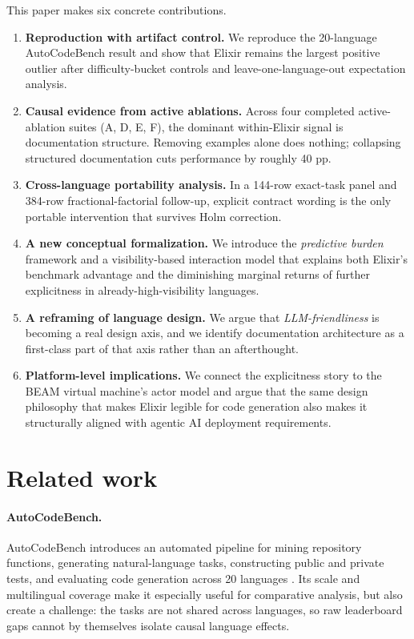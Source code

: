 \documentclass[11pt]{article}
\newcommand{\acb}{AutoCodeBench}
\newcommand{\pp}{pp}
\newcommand{\elixir}{Elixir}
\begin{document}
This paper makes six concrete contributions.

\begin{enumerate}
  \item \textbf{Reproduction with artifact control.} We reproduce the 20-language \acb{} result and show that \elixir{} remains the largest positive outlier after difficulty-bucket controls and leave-one-language-out expectation analysis.
  \item \textbf{Causal evidence from active ablations.} Across four completed active-ablation suites (A, D, E, F), the dominant within-\elixir{} signal is documentation structure. Removing examples alone does nothing; collapsing structured documentation cuts performance by roughly 40 \pp.
  \item \textbf{Cross-language portability analysis.} In a 144-row exact-task panel and 384-row fractional-factorial follow-up, explicit contract wording is the only portable intervention that survives Holm correction.
  \item \textbf{A new conceptual formalization.} We introduce the \emph{predictive burden} framework and a visibility-based interaction model that explains both \elixir{}'s benchmark advantage and the diminishing marginal returns of further explicitness in already-high-visibility languages.
  \item \textbf{A reframing of language design.} We argue that \emph{LLM-friendliness} is becoming a real design axis, and we identify documentation architecture as a first-class part of that axis rather than an afterthought.
  \item \textbf{Platform-level implications.} We connect the explicitness story to the BEAM virtual machine's actor model and argue that the same design philosophy that makes \elixir{} legible for code generation also makes it structurally aligned with agentic AI deployment requirements.
\end{enumerate}

\section{Related work}

\paragraph{AutoCodeBench.}
\acb{} introduces an automated pipeline for mining repository functions, generating natural-language tasks, constructing public and private tests, and evaluating code generation across 20 languages \cite{acb}. Its scale and multilingual coverage make it especially useful for comparative analysis, but also create a challenge: the tasks are not shared across languages, so raw leaderboard gaps cannot by themselves isolate causal language effects.
\end{document}
